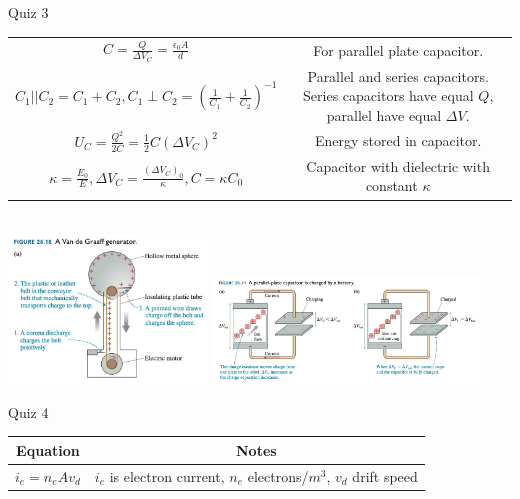 \documentclass{article}
\newcommand{\eps}{\epsilon_0}
\begin{document}
\begin{center}
\begin{section}{Quiz 3}
\begin{tabular}{|c|c|}
		 $C = \frac{Q}{\Delta V_C} = \frac{\eps A}{d}$                                  & For parallel plate capacitor.                                               \\

		 $C_1 || C_2 = C_1 + C_2, C_1 \perp C_2 = (\frac{1}{C_1} + \frac{1}{C_2})^{-1}$ & \makecell{Parallel and series capacitors. Series capacitors have equal $Q$, \\
		 parallel have equal $\Delta V$.}                                                                                                                             \\

		 $U_C = \frac{Q^2}{2 C} = \frac{1}{2} C (\Delta V_C)^2$                         & Energy stored in capacitor.                                                 \\
		 $\kappa = \frac{E_0}{E}, \Delta V_C
		 = \frac{(\Delta V_C)_0}{\kappa}, C = \kappa C_0$                               & Capacitor with dielectric with constant $\kappa$                            \\

		 \hline
	 \end{tabular}
	 \\
	 \includegraphics[width=150pt]{final_cheet_sheet_resources/gvotcdmxjpwdvcicmenhqcknyxedpudu.jpg}
	 \includegraphics[width=200pt]{final_cheet_sheet_resources/khlzwxxfhkebtizrrtyhiwmbjhtfbalk.jpg}
	\end{section}

	\begin{section}{Quiz 4}
	 \begin{tabular}{|c|c|}
		 \hline
		 Equation                                                                   & Notes                                                               \\
		 \hline
		 $i_e = n_e A v_d$                                                          & $i_e$ is electron current, $n_e$ electrons/$m^3$, $v_d$ drift speed \\


\end{tabular}
\end{section}
\end{center}
\end{document}
